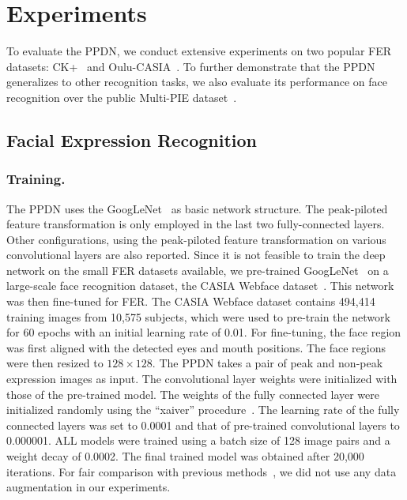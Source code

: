 \documentclass[runningheads]{llncs}
\begin{document}
\section{Experiments}

To evaluate the PPDN, we conduct extensive experiments on two popular 
FER datasets: CK+~\cite{lucey2010extended} and 
Oulu-CASIA~\cite{zhao2011facial}. To further demonstrate that the PPDN
generalizes to other recognition tasks, we also evaluate its performance
on face recognition over the public Multi-PIE 
dataset~\cite{gross2010multi}.

\subsection{Facial Expression Recognition}
\subsubsection{Training.} The PPDN uses the GoogLeNet~\cite{szegedy2015going} 
as basic network structure. The peak-piloted feature transformation is only 
employed in the last two fully-connected layers. Other configurations,
using the peak-piloted feature transformation on various convolutional 
layers are also reported. Since it is not feasible to train the deep network 
on the small FER datasets available, we pre-trained 
GoogLeNet~\cite{szegedy2015going} on a large-scale face recognition dataset,  
the CASIA Webface dataset~\cite{yi2014learning}. This network was then 
fine-tuned for FER. The CASIA Webface dataset contains 494,414 training 
images from 10,575 subjects, which were used to pre-train the network 
for 60 epochs with an initial learning rate of 0.01.%
  For fine-tuning, %
the face region 
was first aligned with the detected eyes and mouth positions.%
 The face regions 
were then resized to $128 \times 128$. The PPDN takes a pair of peak and 
non-peak expression images as input. The convolutional layer weights
were initialized with those of the pre-trained model. The weights of the 
fully connected layer were initialized randomly using the 
``xaiver'' procedure~\cite{glorot2010understanding}. The learning rate of 
the fully connected layers was set to 0.0001 and that of pre-trained 
convolutional layers to 0.000001.  ALL models were trained 
using a batch size of 128 image pairs and a weight 
decay of 0.0002. The final trained model was obtained after 20,000 
iterations. For fair comparison with previous 
methods~\cite{zhong2012learning,shan2009facial,liu2014facial}, we did not 
use any data augmentation in our experiments. 
\end{document}
